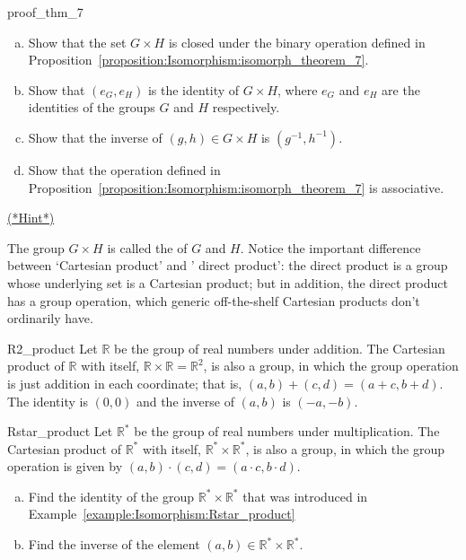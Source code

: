 \begin{exercise}{proof_thm_7}
\begin{enumerate}[(a)]
\item
Show that the set $G \times H$ is closed under the binary operation defined in Proposition~\ref{proposition:Isomorphism:isomorph_theorem_7}. 
\item Show that $(e_G, e_H)$ is the identity of $G \times H$,
where $e_G$ and $e_H$ are the identities of the groups $G$ and $H$ respectively.
\item Show that the inverse of $(g, h) \in G \times H$ is $(g^{-1}, h^{-1})$.  
\item Show that the operation defined in Proposition~\ref{proposition:Isomorphism:isomorph_theorem_7} is associative.
\end{enumerate}
\hyperref[sec:Isomorphism:hints]{(*Hint*)}
\end{exercise}

The group $G \times H$ is called the  of  $G$ and $H$. Notice the important difference between `Cartesian product' and ' direct product': the  direct product is a group whose underlying set is a Cartesian product; but in addition, the  direct product has a group operation, which generic off-the-shelf Cartesian products don't ordinarily have. 

\begin{example}{R2_product}
Let ${\mathbb R}$ be the group of real numbers under addition.  The Cartesian product of ${\mathbb R}$ with itself, ${\mathbb R} \times {\mathbb R} = {\mathbb R}^2$, is also a group, in which the group operation is just addition in each coordinate; that is, $(a, b) + (c, d) = (a + c, b + d)$.  The identity is $(0,0)$ and the inverse of $(a, b)$ is $(-a, -b)$.
\end{example}

\begin{example}{Rstar_product}
Let ${\mathbb R}^*$ be the group of real numbers under multiplication.  The Cartesian product of ${\mathbb R}^*$ with itself, ${\mathbb R}^* \times {\mathbb R}^* $, is also a group, in which the group operation is given by $(a, b) \cdot  (c, d) = (a \cdot  c, b \cdot  d)$.  \end{example}

\begin{exercise}{}
\begin{enumerate}[(a)]
\item
Find the identity of the group ${\mathbb R}^* \times {\mathbb R}^* $ that was introduced in Example~\ref{example:Isomorphism:Rstar_product}
\item
Find the inverse of the element  $(a,b) \in {\mathbb R}^* \times {\mathbb R}^* $.
\end{enumerate}
\end{exercise}

